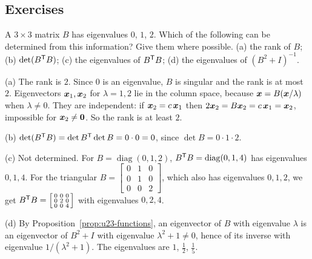 \subsection{Exercises}

\begin{exercise}\label{exr:u23-B012}
A $3\times3$ matrix $B$ has eigenvalues $0$, $1$, $2$. Which of the following can be
determined from this information? Give them where possible.
(a) the rank of $B$; (b) $\det(B^{\mathsf{T}} B)$; (c) the eigenvalues of $B^{\mathsf{T}} B$;
(d) the eigenvalues of $(B^{2}+I)^{-1}$.
\end{exercise}
\begin{solution}
(a) The rank is $2$. Since $0$ is an eigenvalue, $B$ is singular and the rank is at most $2$.
Eigenvectors $\boldsymbol{x}_1,\boldsymbol{x}_2$ for $\lambda=1,2$ lie in the column space, because
$\boldsymbol{x}=B(\boldsymbol{x}/\lambda)$ when $\lambda\neq0$. They are independent: if
$\boldsymbol{x}_2=c\,\boldsymbol{x}_1$ then $2\boldsymbol{x}_2=B\boldsymbol{x}_2=c\,\boldsymbol{x}_1=\boldsymbol{x}_2$, impossible for
$\boldsymbol{x}_2\neq\boldsymbol{0}$. So the rank is at least $2$.

(b) $\det(B^{\mathsf{T}} B)=\det B^{\mathsf{T}}\det B=0\cdot0=0$, since $\det B=0\cdot1\cdot2$.

(c) Not determined. For $B=\operatorname{diag}(0,1,2)$, $B^{\mathsf{T}} B=\operatorname{diag}(0,1,4)$
has eigenvalues $0,1,4$. For the triangular
$B=\left[\begin{smallmatrix} 0&1&0\\ 0&1&0\\ 0&0&2\end{smallmatrix}\right]$, which also has
eigenvalues $0,1,2$, we get
$B^{\mathsf{T}} B=\left[\begin{smallmatrix} 0&0&0\\ 0&2&0\\ 0&0&4\end{smallmatrix}\right]$ with
eigenvalues $0,2,4$.

(d) By Proposition~\ref{prop:u23-functions}, an eigenvector of $B$ with eigenvalue
$\lambda$ is an eigenvector of $B^{2}+I$ with eigenvalue $\lambda^{2}+1\neq0$, hence of its
inverse with eigenvalue $1/(\lambda^{2}+1)$. The eigenvalues are $1$, $\tfrac12$, $\tfrac15$.
\end{solution}

